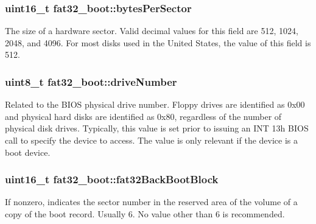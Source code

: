 \subsubsection[{\texorpdfstring{bytes\+Per\+Sector}{bytesPerSector}}]{\setlength{\rightskip}{0pt plus 5cm}uint16\+\_\+t fat32\+\_\+boot\+::bytes\+Per\+Sector}\hypertarget{structfat32__boot_a03c7086a8c988257a6678179a67a3fee}{}\label{structfat32__boot_a03c7086a8c988257a6678179a67a3fee}
The size of a hardware sector. Valid decimal values for this field are 512, 1024, 2048, and 4096. For most disks used in the United States, the value of this field is 512. 
\subsubsection[{\texorpdfstring{drive\+Number}{driveNumber}}]{\setlength{\rightskip}{0pt plus 5cm}uint8\+\_\+t fat32\+\_\+boot\+::drive\+Number}\hypertarget{structfat32__boot_aca415c1a6eb1c242d460a6d0ffa9ebec}{}\label{structfat32__boot_aca415c1a6eb1c242d460a6d0ffa9ebec}
Related to the B\+I\+OS physical drive number. Floppy drives are identified as 0x00 and physical hard disks are identified as 0x80, regardless of the number of physical disk drives. Typically, this value is set prior to issuing an I\+NT 13h B\+I\+OS call to specify the device to access. The value is only relevant if the device is a boot device. 
\subsubsection[{\texorpdfstring{fat32\+Back\+Boot\+Block}{fat32BackBootBlock}}]{\setlength{\rightskip}{0pt plus 5cm}uint16\+\_\+t fat32\+\_\+boot\+::fat32\+Back\+Boot\+Block}\hypertarget{structfat32__boot_ac93acdae62dab5cd1f7a35187992dbf2}{}\label{structfat32__boot_ac93acdae62dab5cd1f7a35187992dbf2}
If nonzero, indicates the sector number in the reserved area of the volume of a copy of the boot record. Usually 6. No value other than 6 is recommended. 
